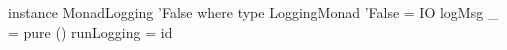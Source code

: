 \begin{code}
instance MonadLogging 'False where
  type LoggingMonad 'False = IO
  logMsg _ = pure ()
  runLogging = id
\end{code}
